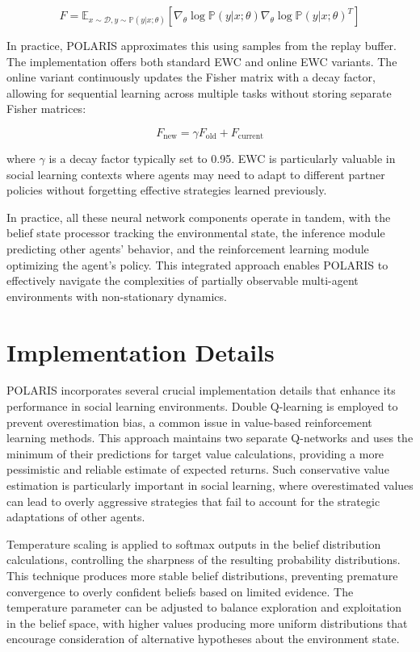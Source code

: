\documentclass[a4paper,12pt]{report}
\begin{document}
\begin{equation}
    F = \mathbb{E}_{x \sim \mathcal{D}, y \sim \mathbb{P}(y|x; \theta)} \left[ \nabla_\theta \log \mathbb{P}(y|x; \theta) \nabla_\theta \log \mathbb{P}(y|x; \theta)^T \right]
\end{equation}

In practice, POLARIS approximates this using samples from the replay buffer. The implementation offers both standard EWC and online EWC variants. The online variant continuously updates the Fisher matrix with a decay factor, allowing for sequential learning across multiple tasks without storing separate Fisher matrices:

\begin{equation}
    F_{\text{new}} = \gamma F_{\text{old}} + F_{\text{current}}
\end{equation}

where $\gamma$ is a decay factor typically set to 0.95. EWC is particularly valuable in social learning contexts where agents may need to adapt to different partner policies without forgetting effective strategies learned previously.

In practice, all these neural network components operate in tandem, with the belief state processor tracking the environmental state, the inference module predicting other agents' behavior, and the reinforcement learning module optimizing the agent's policy. This integrated approach enables POLARIS to effectively navigate the complexities of partially observable multi-agent environments with non-stationary dynamics.

\section{Implementation Details}

POLARIS incorporates several crucial implementation details that enhance its performance in social learning environments. Double Q-learning is employed to prevent overestimation bias, a common issue in value-based reinforcement learning methods. This approach maintains two separate Q-networks and uses the minimum of their predictions for target value calculations, providing a more pessimistic and reliable estimate of expected returns. Such conservative value estimation is particularly important in social learning, where overestimated values can lead to overly aggressive strategies that fail to account for the strategic adaptations of other agents.

Temperature scaling is applied to softmax outputs in the belief distribution calculations, controlling the sharpness of the resulting probability distributions. This technique produces more stable belief distributions, preventing premature convergence to overly confident beliefs based on limited evidence. The temperature parameter can be adjusted to balance exploration and exploitation in the belief space, with higher values producing more uniform distributions that encourage consideration of alternative hypotheses about the environment state.
\end{document}

